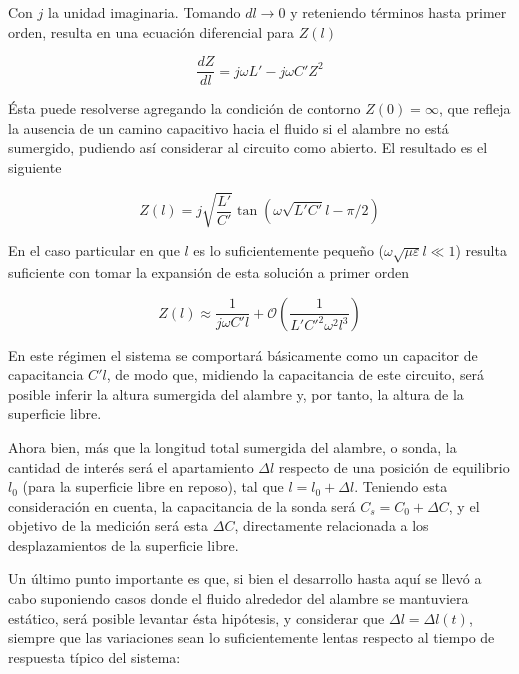 Con $j$ la unidad imaginaria. Tomando $dl\rightarrow0$ y reteniendo términos hasta primer orden, resulta en una ecuación diferencial para $Z(l)$ 

\begin{equation}
	\frac{dZ}{dl} = j\omega L' - j\omega C'Z^2
\end{equation} 

Ésta puede resolverse agregando la condición de contorno $Z(0)=\infty$, que refleja la ausencia de un camino capacitivo hacia el fluido si el alambre no está sumergido, pudiendo así considerar al circuito como abierto. El resultado es el siguiente %

\begin{equation}
	Z(l) = j\sqrt{\frac{L'}{C'}} \tan\left(\omega \sqrt{L'C'} l - \pi/2\right)
\end{equation}

En el caso particular en que $l$ es lo suficientemente pequeño ($\omega\sqrt{\mu\varepsilon} l\ll 1$) resulta suficiente con tomar la expansión de esta solución a primer orden 

\begin{equation}
	Z(l) \approx \frac{1}{j\omega C' l} + \mathcal{O}\left(\frac{1}{L'C'^2\omega^2l^3}\right)
\end{equation}

En este régimen el sistema se comportará básicamente como un capacitor de capacitancia $C'l$, de modo que, midiendo la capacitancia de este circuito, será posible inferir la altura sumergida del alambre y, por tanto, la altura de la superficie libre. %

Ahora bien, más que la longitud total sumergida del alambre, o sonda, la cantidad de interés será el apartamiento $\Delta l$ respecto de una posición de equilibrio $l_{0}$ (para la superficie libre en reposo), tal que $l=l_{0}+\Delta l$. Teniendo esta consideración en cuenta, la capacitancia de la sonda será $C_s = C_{0} + \Delta C$, y el objetivo de la medición será esta $\Delta C$, directamente relacionada a los desplazamientos de la superficie libre. %



Un último punto importante es que, si bien el desarrollo hasta aquí se llevó a cabo suponiendo casos donde el fluido alrededor del alambre se mantuviera estático, será posible levantar ésta hipótesis, y considerar que $\Delta l=\Delta l(t)$, siempre que las variaciones sean lo suficientemente lentas respecto al tiempo de respuesta típico del sistema: %

